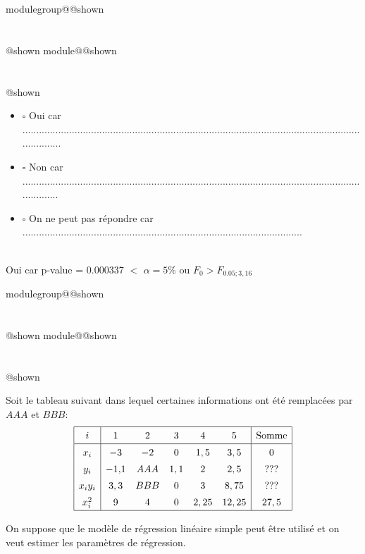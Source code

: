 \documentclass{Evaluation}
\makeatletter
\newcommand{\currentmodulekey}{}
\newcommand{\currentmoduletitle}{}
\newcommand{\currentgroupkey}{}
\newcommand{\currentgrouptitle}{}
\newcommand{\showmoduleifneeded}{%
  \ifx\currentgroupkey\empty\else
    \expandafter\ifx\csname modulegroup@\currentgroupkey @shown\endcsname\relax
      \section*{\currentgrouptitle}%
      \expandafter\gdef\csname modulegroup@\currentgroupkey @shown\endcsname{1}%
    \fi
  \fi
  \expandafter\ifx\csname module@\currentmodulekey @shown\endcsname\relax
    \section*{\currentmoduletitle}%
    \expandafter\gdef\csname module@\currentmodulekey @shown\endcsname{1}%
  \fi
}
\newenvironment{A23}{\showmoduleifneeded}{}
\newenvironment{H26}{\showmoduleifneeded}{}
\makeatother
\begin{document}
\begin{questions}
\begin{A23}
\begin{parts}
    \begin{itemize}
    \item $\square$ Oui car .........................................................................................................................................
    \item $\square$ Non car ........................................................................................................................................
    \item $\square$ On ne peut pas répondre car ......................................................................................................\\ \ \\
\end{itemize}


\begin{solution}
Oui car p-value = 0.000337 $<$ $\alpha=5\%$  ou $F_0 > F_{0.05; 3,16}$
\end{solution}

\end{parts}
\end{A23}

\begin{H26}
\question {} %
Soit le tableau suivant dans lequel certaines informations ont été remplacées par $AAA$ et $BBB$:
\begin{align*}\renewcommand{\arraystretch}{1.4}
   \begin{array}{|c|ccccc|c|}
   \hline
   i & 1 & 2 & 3& 4& 5& \text{Somme}\\ \hline
x_i & -3 & -2 & 0 & 1,5 & 3,5  &0 \\
y_i & -1{,}1 & AAA & 1,1 & 2 & 2,5 & ???\\
x_iy_i & 3,3 & BBB & 0 & 3 & 8,75 & ??? \\
x_i^2 & 9 & 4 & 0 & 2,25 & 12,25 & 27,5\\ \hline
\end{array}
\end{align*}

On suppose que le modèle de régression linéaire simple peut être utilisé et on veut estimer les paramètres de régression.

\end{H26}
\end{questions}
\end{document}
